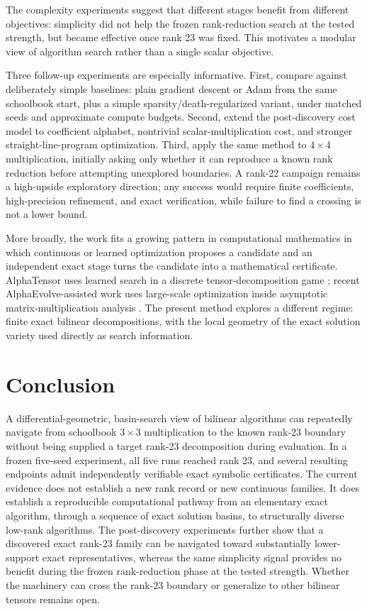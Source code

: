 \documentclass[11pt]{article}
\begin{document}
The complexity experiments suggest that different stages benefit from different objectives: simplicity did not help the frozen rank-reduction search at the tested strength, but became effective once rank 23 was fixed.  This motivates a modular view of algorithm search rather than a single scalar objective.

Three follow-up experiments are especially informative.  First, compare against deliberately simple baselines: plain gradient descent or Adam from the same schoolbook start, plus a simple sparsity/death-regularized variant, under matched seeds and approximate compute budgets.  Second, extend the post-discovery cost model to coefficient alphabet, nontrivial scalar-multiplication cost, and stronger straight-line-program optimization.  Third, apply the same method to $4\times4$ multiplication, initially asking only whether it can reproduce a known rank reduction before attempting unexplored boundaries.  A rank-22 campaign remains a high-upside exploratory direction; any success would require finite coefficients, high-precision refinement, and exact verification, while failure to find a crossing is not a lower bound.

More broadly, the work fits a growing pattern in computational mathematics in which continuous or learned optimization proposes a candidate and an independent exact stage turns the candidate into a mathematical certificate.  AlphaTensor uses learned search in a discrete tensor-decomposition game \cite{fawzi2022}; recent AlphaEvolve-assisted work uses large-scale optimization inside asymptotic matrix-multiplication analysis \cite{dupont2026}.  The present method explores a different regime: finite exact bilinear decompositions, with the local geometry of the exact solution variety used directly as search information.

\section{Conclusion}

A differential-geometric, basin-search view of bilinear algorithms can repeatedly navigate from schoolbook $3\times3$ multiplication to the known rank-23 boundary without being supplied a target rank-23 decomposition during evaluation.  In a frozen five-seed experiment, all five runs reached rank 23, and several resulting endpoints admit independently verifiable exact symbolic certificates.  The current evidence does not establish a new rank record or new continuous families.  It does establish a reproducible computational pathway from an elementary exact algorithm, through a sequence of exact solution basins, to structurally diverse low-rank algorithms. The post-discovery experiments further show that a discovered exact rank-23 family can be navigated toward substantially lower-support exact representatives, whereas the same simplicity signal provides no benefit during the frozen rank-reduction phase at the tested strength. Whether the machinery can cross the rank-23 boundary or generalize to other bilinear tensors remains open.




\end{document}
